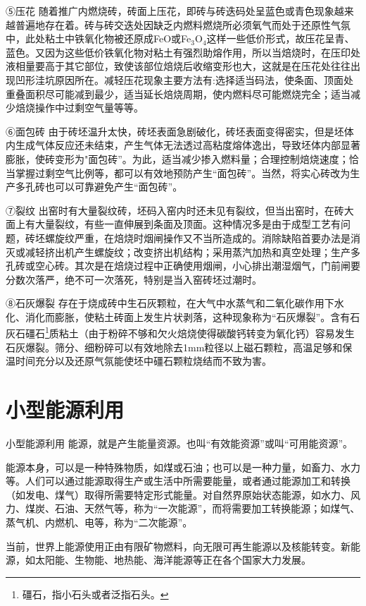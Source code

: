 \documentclass{ctexbook}
\begin{document}
⑤压花 随着推广内燃烧砖，砖面上压花，即砖与砖迭码处呈蓝色或青色现象越来越普遍地存在着。砖与砖交迭处因缺乏内燃料燃烧所必须氧气而处于还原性气氛中，此处粘土中铁氧化物被还原成FeO或Fe$_3$O$_4$这样一些低价形式，故压花呈青、蓝色。又因为这些低价铁氧化物对粘土有强烈助熔作用，所以当焙烧时，在压印处液相量要高于其它部位，致使该部位焙烧后收缩变形也大，这就是在压花处往往出现凹形洼坑原因所在。减轻压花现象主要方法有:选择适当码法，使条面、顶面处重叠面积尽可能减到最少，适当延长焙烧周期，使内燃料尽可能燃烧完全；适当减少焙烧操作中过剩空气量等等。

⑥面包砖 由于砖坯温升太快，砖坯表面急剧破化，砖坯表面变得密实，但是坯体内生成气体反应还未结束，产生气体无法透过高粘度熔体逸出，导致坯体内部显著膨胀，使砖变形为"面包砖”。为此，适当减少掺入燃料量；合理控制焙烧速度；恰当掌握过剩空气比例等，都可以有效地预防产生“面包砖”。当然，将实心砖改为生产多孔砖也可以可靠避免产生“面包砖”。

⑦裂纹 出窑时有大量裂纹砖，坯码入窑内时还未见有裂纹，但当出窑时，在砖大面上有大量裂纹，有些一直伸展到条面及顶面。这种情况多是由于成型工艺有问题，砖坯螺旋纹严重，在焙烧时烟闸操作又不当所造成的。消除缺陷首要办法是消灭或减轻挤出机产生螺旋纹；改变挤出机结构；采用蒸汽加热和真空处理；生产多孔砖或空心砖。其次是在焙烧过程中正确使用烟闸，小心排出潮湿烟气，门前闸要分数次落严，绝不可一次落死，特别是当入窑砖坯过潮时。

⑧石灰爆裂 存在于烧成砖中生石灰颗粒，在大气中水蒸气和二氧化碳作用下水化、消化而膨胀，使粘土砖面上发生片状剥落，这种现象称为“石灰爆裂”。含有石灰石礓石\footnote{礓石，指小石头或者泛指石头。}质粘土（由于粉碎不够和欠火焙烧使得碳酸钙转变为氧化钙）容易发生石灰爆裂。筛分、细粉碎可以有效地除去1mm粒径以上磁石颗粒，高温足够和保温时间充分以及还原气氛能使坯中礓石颗粒烧结而不致为害。    
\chapter{小型能源利用}
小型能源利用
能源，就是产生能量资源。也叫“有效能资源”或叫“可用能资源”。

能源本身，可以是一种特殊物质，如煤或石油；也可以是一种力量，如畜力、水力等。人们可以通过能源取得生产或生活中所需要能量，或者通过能源加工和转换（如发电、煤气）取得所需要特定形式能量。对自然界原始状态能源，如水力、风力、煤炭、石油、天然气等，称为“一次能源”，而将需要加工转换能源；如煤气、蒸气机、内燃机、电等，称为“二次能源”。

当前，世界上能源使用正由有限矿物燃料，向无限可再生能源以及核能转变。新能源，如太阳能、生物能、地热能、海洋能源等正在各个国家大力发展。
\end{document}
